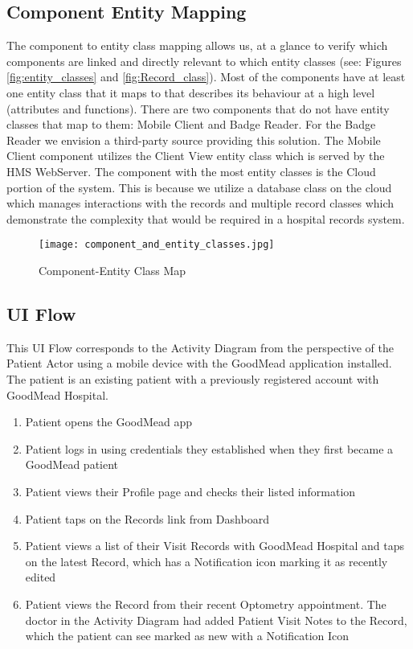 \documentclass[a4paper, 11pt]{article}
\begin{document}
\subsection{Component Entity Mapping}
The component to entity class mapping allows us, at a glance to verify which components are linked and directly relevant to which entity classes (see: Figures \ref{fig:entity_classes} and \ref{fig:Record_class}). Most of the components have at least one entity class that it maps to that describes its behaviour at a high level (attributes and functions). There are two components that do not have entity classes that map to them: Mobile Client and Badge Reader. For the Badge Reader we envision a third-party source providing this solution. The Mobile Client component utilizes the Client View entity class which is served by the HMS WebServer. The component with the most entity classes is the Cloud portion of the system. This is because we utilize a database class on the cloud which manages interactions with the records and multiple record classes which demonstrate the complexity that would be required in a hospital records system. 

\begin{figure}[!htb]
    \centering
    \texttt{[image: component\_and\_entity\_classes.jpg]}
    \caption{Component-Entity Class Map}
    \label{fig:components_and_entity_classes}
\end{figure}

\subsection{UI Flow}
This UI Flow corresponds to the Activity Diagram from the perspective of the Patient Actor using a mobile device with the GoodMead application installed. The patient is an existing patient with a previously registered account with GoodMead Hospital.

\begin{enumerate}
    \item Patient opens the GoodMead app
    \item Patient logs in using credentials they established when they first became a GoodMead patient
    \item Patient views their Profile page and checks their listed information
    \item Patient taps on the Records link from Dashboard
    \item Patient views a list of their Visit Records with GoodMead Hospital and taps on the latest Record, which has a Notification icon marking it as recently edited
    \item Patient views the Record from their recent Optometry appointment. The doctor in the Activity Diagram had added Patient Visit Notes to the Record, which the patient can see marked as new with a Notification Icon
    
\end{enumerate}
\end{document}
